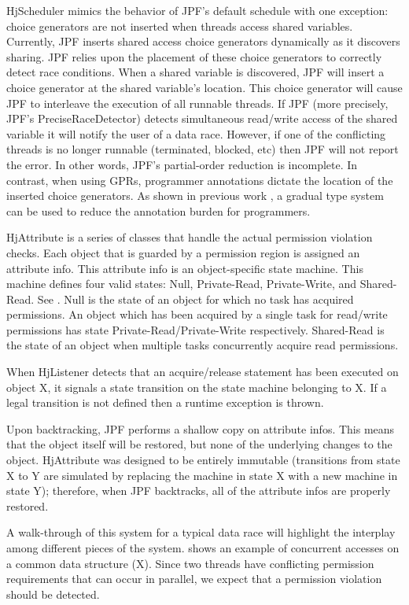 HjScheduler mimics the behavior of JPF's default schedule with one exception:
choice generators are not inserted when threads access shared variables.
Currently, JPF inserts shared access choice generators dynamically as it
discovers sharing. JPF relies upon the placement of these choice generators to
correctly detect race conditions. When a shared variable is discovered, JPF will
insert a choice generator at the shared variable's location. This choice
generator will cause JPF to interleave the execution of all runnable threads. If
JPF (more precisely, JPF's PreciseRaceDetector) detects simultaneous read/write
access of the shared variable it will notify the user of a data race. However,
if one of the conflicting threads is no longer runnable (terminated, blocked,
etc) then JPF will not report the error. In other words, JPF's partial-order reduction is
incomplete. In contrast, when using GPRs, programmer annotations dictate the location of the inserted
choice generators. As shown in previous work
\cite{Westbrook:2012:PPR:2367163.2367201}, a gradual type system can be used to
reduce the annotation burden for programmers.
%

HjAttribute is a series of classes that handle the actual permission
violation checks. Each object that is guarded by a permission region is assigned
an attribute info. This attribute info is an object-specific state machine. This
machine defines four valid states: Null, Private-Read, Private-Write, and
Shared-Read. See . Null is the state of an object for which no task has acquired
permissions. An object which has been acquired by a single task for read/write
permissions has state Private-Read/Private-Write respectively. Shared-Read is
the state of an object when multiple tasks concurrently acquire read
permissions.

When HjListener detects that an acquire/release statement has been executed on
object X, it signals a state transition on the state machine belonging to X. If a
legal transition is not defined then a runtime exception is thrown. 

Upon backtracking, JPF performs a shallow copy on attribute infos. This means
that the object itself will be restored, but none of the underlying changes to
the object. HjAttribute was designed to be entirely immutable (transitions from
state X to Y are simulated by replacing the machine in state X with a new
machine in state Y); therefore, when JPF backtracks, all of the
attribute infos are properly restored.

A walk-through of this system for a typical data race will highlight the
interplay among different pieces of the system.
 shows an example of concurrent accesses on a
common data structure (X). Since two threads have conflicting permission requirements
that can occur in parallel, we expect that a permission violation should be detected.

